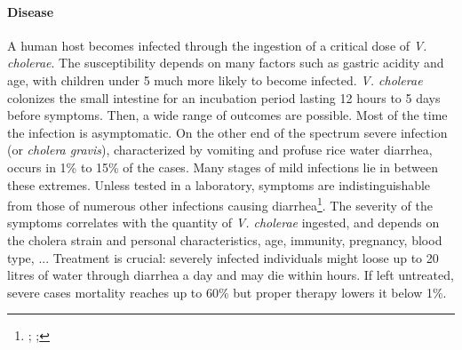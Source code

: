 \paragraph{Disease} A human host becomes infected through the ingestion of a critical dose of \emph{V. cholerae}. The susceptibility depends on many factors such as gastric acidity and age, with children under 5 much more likely to become infected\cite{Sack:Cholera:2004}. \textit{V. cholerae} colonizes the small intestine for an incubation period lasting 12 hours to 5 days\cite{Azman:IncubationPeriodCholera:2013} before symptoms. Then, a wide range of outcomes are possible. Most of the time the infection is asymptomatic. On the other end of the spectrum severe infection (or \emph{cholera gravis}), characterized by vomiting and profuse rice water diarrhea, occurs in 1\% to 15\% of the cases. Many stages of mild infections lie in between these extremes. Unless tested in a laboratory, symptoms are indistinguishable from those of numerous other infections causing diarrhea\footnote{;  ; }.  The severity of the symptoms correlates with the quantity of \textit{V. cholerae} ingested\cite{Brouwer:DoseresponseRelationshipsEnvironmentally:2017}, and depends on the cholera strain and personal characteristics, age, immunity, pregnancy, blood type\cite{WHO:CholeraVaccinesWHO:2017,Azman:IncubationPeriodCholera:2013}, ...%
 Treatment is crucial: severely infected individuals might loose up to 20 litres of water through diarrhea a day and may die within hours. If left untreated, severe cases mortality reaches up to 60\% but proper therapy lowers it below 1\%\cite{Luquero:MortalityRatesCholera:2016}.

